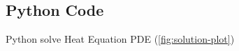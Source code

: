 \documentclass[a4paper]{article}
\begin{document}
\begin{appendix}
   \newpage
   \addappheadtotoc
   \appendixpage
   \section{Python Code}
   \sloppy
   Python solve Heat Equation PDE (\ref{fig:solution-plot})
   
\end{appendix}
\end{document}
